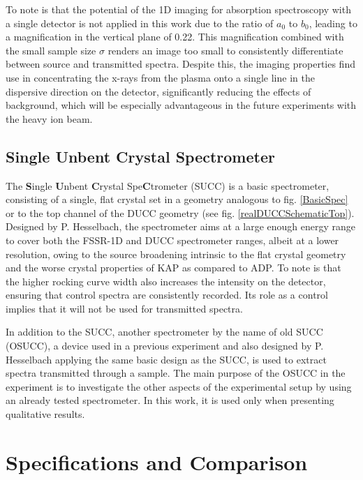 To note is that the potential of the 1D imaging for 
absorption spectroscopy with a single detector is not 
applied in this work due to the ratio of $a_0$ to $b_0$, 
leading to a magnification in the vertical plane of 
0.22. This magnification combined with the small 
sample size $\sigma$ renders an image too small to 
consistently differentiate between source and 
transmitted spectra. Despite this, the imaging 
properties find use in 
concentrating the x-rays from the plasma onto a 
single line in the dispersive direction on the 
detector, significantly reducing the effects of 
background, which will be especially advantageous in 
the future experiments with the heavy ion beam.

\subsection{Single Unbent Crystal Spectrometer}
\label{section: SUCC}
The \textbf{S}ingle 
\textbf{U}nbent \textbf{C}rystal 
Spe\textbf{C}trometer (SUCC) is a basic spectrometer, consisting of a 
single, flat crystal set in a geometry analogous to fig. \ref{BasicSpec} 
or to the top channel of the DUCC geometry (see fig. 
\ref{realDUCCSchematicTop}). Designed by P. Hesselbach, the spectrometer 
aims at a large enough energy range to cover both the FSSR-1D and DUCC 
spectrometer ranges, albeit at a lower resolution, owing to the source 
broadening intrinsic to the flat crystal geometry and the worse crystal 
properties of KAP as compared to ADP. To note is that the higher 
rocking curve width also increases the intensity on the detector, 
ensuring that control spectra are consistently recorded. Its role as a 
control implies that it will not be used for transmitted spectra.

In addition to the SUCC, another spectrometer by the name of old SUCC (OSUCC), a device used in a previous experiment and also designed by P. Hesselbach applying the same basic design as the SUCC, is used to extract spectra transmitted through a sample. The main purpose of the OSUCC in the experiment is to investigate the other aspects of the experimental setup by using an already tested spectrometer. In this work, it is used only when presenting qualitative results.

\section{Specifications and Comparison}
\label{section: specs and comparison}

